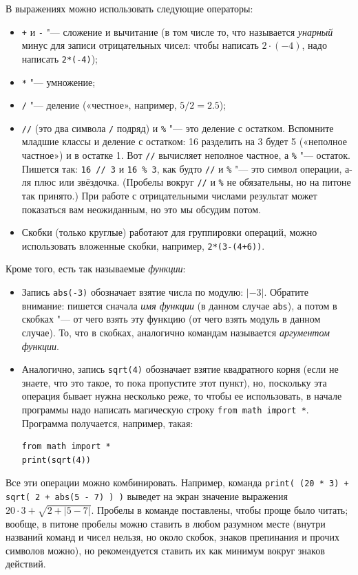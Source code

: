 В выражениях можно использовать следующие операторы:
\begin{itemize}
\item \verb`+` и \verb`-` "--- сложение и вычитание (в том числе то, что называется \textit{унарный} минус для записи отрицательных чисел: чтобы написать $2\cdot(-4)$, надо написать \verb`2*(-4)`);
\item \verb`*` "--- умножение;
\item \verb`/` "--- деление («честное», например, $5/2=2.5$);
\item \verb`//` (это два символа \verb`/` подряд) и \verb`%` "--- это деление с остатком. 
Вспомните младшие классы и деление с остатком: 16 разделить на 3 будет 5 («неполное частное») и в остатке 1. 
Вот \verb`//` вычисляет неполное частное, а \verb`%` "--- остаток. Пишется так: \verb`16 // 3` и \verb`16 % 3`, 
как будто \verb`//` и \verb`%`{} "--- это символ операции, а-ля плюс или звёздочка. 
(Пробелы вокруг \verb`//` и \verb`%` не обязательны, но на питоне так принято.) При работе 
с отрицательными числами результат может показаться вам неожиданным, но это мы обсудим потом.
\item Скобки (только круглые) работают для группировки операций, можно использовать вложенные скобки, например, \verb`2*(3-(4+6))`.
\end{itemize}

Кроме того, есть так называемые \textit{функции}:
\begin{itemize}
\item Запись \verb`abs(-3)` обозначает взятие числа по модулю: $|{-}3|$. Обратите внимание: пишется сначала \textit{имя функции} (в данном случае \verb`abs`), а потом в скобках "--- от чего взять эту функцию (от чего взять модуль в данном случае). То, что в скобках, аналогично командам называется \textit{аргументом функции}.
\item Аналогично, запись \verb`sqrt(4)` обозначает взятие квадратного корня (если не знаете, что это такое, то пока пропустите этот пункт), но, поскольку эта операция бывает нужна несколько реже, то чтобы ее использовать, в начале программы надо написать магическую строку \verb`from math import *`. Программа получается, например, такая:
\begin{verbatim}
from math import *
print(sqrt(4))
\end{verbatim}
\end{itemize}

Все эти операции можно комбинировать. Например, команда \verb`print( (20 * 3) + sqrt( 2 + abs(5 - 7) ) )` выведет на экран значение выражения $20\cdot 3 + \sqrt{2+|5-7|}$. Пробелы в команде поставлены, чтобы проще было читать; вообще, в питоне пробелы можно ставить в любом разумном месте (внутри названий команд и чисел нельзя, но около скобок, знаков препинания и прочих символов можно), но рекомендуется ставить их как минимум вокруг знаков действий.

